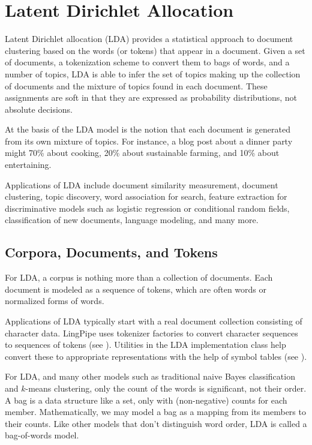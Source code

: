 \chapter{Latent Dirichlet Allocation}\label{chapter:lda}

Latent Dirichlet allocation (LDA) provides a statistical approach to
document clustering based on the words (or tokens) that appear in a
document.  Given a set of documents, a tokenization scheme to convert
them to bags of words, and a number of topics, LDA is able to infer
the set of topics making up the collection of documents and the
mixture of topics found in each document.  These assignments are soft
in that they are expressed as probability distributions, not absolute
decisions.

At the basis of the LDA model is the notion that each document is
generated from its own mixture of topics.  For instance, a blog post
about a dinner party might 70\% about cooking, 20\% about sustainable
farming, and 10\% about entertaining.

Applications of LDA include document similarity measurement, document
clustering, topic discovery, word association for search, feature
extraction for discriminative models such as logistic regression or
conditional random fields, classification of new documents, language
modeling, and many more.

\section{Corpora, Documents, and Tokens}

For LDA, a corpus is nothing more than a collection of documents.
Each document is modeled as a sequence of tokens, which are often
words or normalized forms of words.

Applications of LDA typically start with a real document collection
consisting of character data.  LingPipe uses tokenizer factories to
convert character sequences to sequences of tokens (see
).  Utilities in the LDA implementation class
help convert these to appropriate representations with the help of
symbol tables (see ).

For LDA, and many other models such as traditional naive Bayes
classification and $k$-means clustering, only the count of the words
is significant, not their order.  A bag is a data structure like a
set, only with (non-negative) counts for each member.  Mathematically,
we may model a bag as a mapping from its members to their counts. Like
other models that don't distinguish word order, LDA is called a
bag-of-words model.


